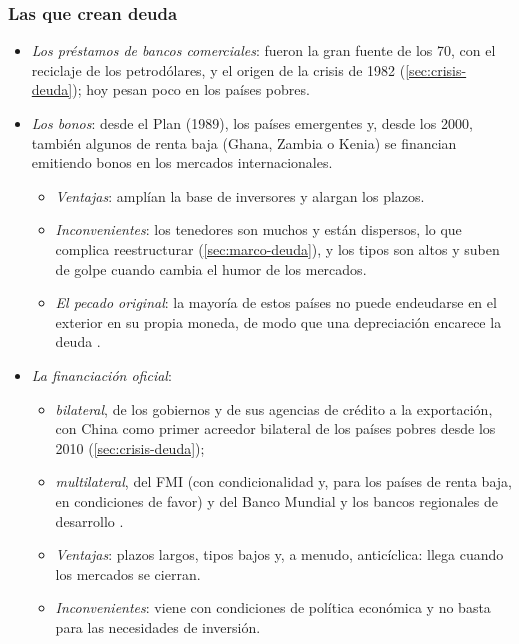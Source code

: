 \documentclass[11pt]{article}
\begin{document}
\subsubsection{Las que crean deuda}\label{sec:con-deuda}

\begin{itemize}
\item \emph{Los préstamos de bancos comerciales}: fueron la gran fuente de los 70, con el reciclaje de los petrodólares, y el origen de la crisis de 1982 (\ref{sec:crisis-deuda}); hoy pesan poco en los países pobres.
\item \emph{Los bonos}: desde el Plan  (1989), los países emergentes y, desde los 2000, también algunos de renta baja (Ghana, Zambia o Kenia) se financian emitiendo bonos en los mercados internacionales.
  \begin{itemize}
  \item \emph{Ventajas}: amplían la base de inversores y alargan los plazos.
  \item \emph{Inconvenientes}: los tenedores son muchos y están dispersos, lo que complica reestructurar (\ref{sec:marco-deuda}), y los tipos son altos y suben de golpe cuando cambia el humor de los mercados.
  \item \emph{El pecado original}: la mayoría de estos países no puede endeudarse en el exterior en su propia moneda, de modo que una depreciación encarece la deuda\nocite{EichengreenHausmann1999,EHP2005PecadoOriginal} .
  \end{itemize}
\item \emph{La financiación oficial}:
  \begin{itemize}
  \item \emph{bilateral}, de los gobiernos y de sus agencias de crédito a la exportación, con China como primer acreedor bilateral de los países pobres desde los 2010 (\ref{sec:crisis-deuda});
  \item \emph{multilateral}, del FMI (con condicionalidad y, para los países de renta baja, en condiciones de favor) y del Banco Mundial y los bancos regionales de desarrollo  .
  \item \emph{Ventajas}: plazos largos, tipos bajos y, a menudo, anticíclica: llega cuando los mercados se cierran.
  \item \emph{Inconvenientes}: viene con condiciones de política económica y no basta para las necesidades de inversión.
  \end{itemize}
\end{itemize}
\end{document}
